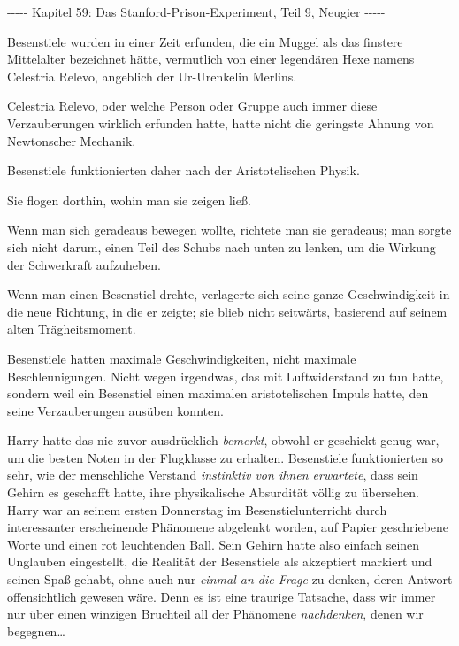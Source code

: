

\hypertarget{das-stanford-prison-experiment-teil-9-neugier}{%

-\/-\/-\/-\/- Kapitel 59: Das Stanford-Prison-Experiment, Teil 9, Neugier -\/-\/-\/-\/-

Besenstiele wurden in einer Zeit erfunden, die ein Muggel als das finstere Mittelalter bezeichnet hätte, vermutlich von einer legendären Hexe namens Celestria Relevo, angeblich der Ur-Urenkelin Merlins.

Celestria Relevo, oder welche Person oder Gruppe auch immer diese Verzauberungen wirklich erfunden hatte, hatte nicht die geringste Ahnung von Newtonscher Mechanik.

Besenstiele funktionierten daher nach der Aristotelischen Physik.

Sie flogen dorthin, wohin man sie zeigen ließ.

Wenn man sich geradeaus bewegen wollte, richtete man sie geradeaus; man sorgte sich nicht darum, einen Teil des Schubs nach unten zu lenken, um die Wirkung der Schwerkraft aufzuheben.

Wenn man einen Besenstiel drehte, verlagerte sich seine ganze Geschwindigkeit in die neue Richtung, in die er zeigte; sie blieb nicht seitwärts, basierend auf seinem alten Trägheitsmoment.

Besenstiele hatten maximale Geschwindigkeiten, nicht maximale Beschleunigungen. Nicht wegen irgendwas, das mit Luftwiderstand zu tun hatte, sondern weil ein Besenstiel einen maximalen aristotelischen Impuls hatte, den seine Verzauberungen ausüben konnten.

Harry hatte das nie zuvor ausdrücklich \emph{bemerkt}, obwohl er geschickt genug war, um die besten Noten in der Flugklasse zu erhalten. Besenstiele funktionierten so sehr, wie der menschliche Verstand \emph{instinktiv von ihnen erwartete}, dass sein Gehirn es geschafft hatte, ihre physikalische Absurdität völlig zu übersehen. Harry war an seinem ersten Donnerstag im Besenstielunterricht durch interessanter erscheinende Phänomene abgelenkt worden, auf Papier geschriebene Worte und einen rot leuchtenden Ball. Sein Gehirn hatte also einfach seinen Unglauben eingestellt, die Realität der Besenstiele als akzeptiert markiert und seinen Spaß gehabt, ohne auch nur \emph{einmal an die Frage} zu denken, deren Antwort offensichtlich gewesen wäre. Denn es ist eine traurige Tatsache, dass wir immer nur über einen winzigen Bruchteil all der Phänomene \emph{nachdenken}, denen wir begegnen…

}
